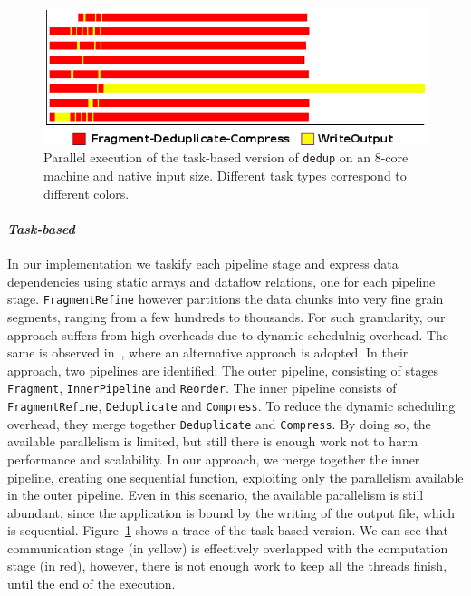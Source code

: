 {\begin{figure}[!t]%
	\centering
	\includegraphics[width=0.9\columnwidth]{ifcg/figures/dedup-ompss-native-8-2dp_tasks}%
	\caption{Parallel execution of the task-based version of \texttt{dedup} on an 8-core machine and native input size. Different task types correspond to different colors.}%
	\label{fig:dedup-2dp_tasks-trace}%
	\vspace{.5cm}
\end{figure}


\paragraph{\textit{Task-based}}
In our implementation we taskify each pipeline stage and express data dependencies using static arrays and dataflow relations, one for each pipeline stage.
\texttt{FragmentRefine} however partitions the data chunks into very fine grain segments, ranging from a few hundreds to thousands. For such granularity,
our approach suffers from high overheads due to dynamic schedulnig overhead. 
The same is observed in~\cite{Vandierendonck:2013:DSP:2503210.2503233}, where 
an alternative approach is adopted. In their approach, two pipelines are identified: The outer pipeline, consisting of stages \texttt{Fragment}, \texttt{InnerPipeline}
and \texttt{Reorder}. The inner pipeline consists of \texttt{FragmentRefine}, \texttt{Deduplicate} and \texttt{Compress}.  To reduce the dynamic scheduling overhead,
they merge together \texttt{Deduplicate} and \texttt{Compress}. By doing so, the available parallelism is limited, but still there is enough work not to harm performance
and scalability. In our approach, we merge together the inner pipeline, creating one sequential function, exploiting only the parallelism available in the outer pipeline.
Even in this scenario, the available parallelism is still abundant, since the application is bound by the writing of the output file, which is sequential.  
Figure~\ref{fig:dedup-2dp_tasks-trace} shows a trace of the task-based version.  We can see that communication stage (in yellow) is effectively overlapped with the computation stage (in red), however,
there is not enough work to keep all the threads finish, until the end of the execution.

}
